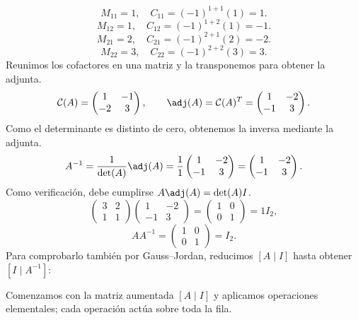 \[
M_{11}=1,\quad C_{11}=(-1)^{1+1}(1)=1.
\]
\[
M_{12}=1,\quad C_{12}=(-1)^{1+2}(1)=-1.
\]
\[
M_{21}=2,\quad C_{21}=(-1)^{2+1}(2)=-2.
\]
\[
M_{22}=3,\quad C_{22}=(-1)^{2+2}(3)=3.
\]
Reunimos los cofactores en una matriz y la transponemos para obtener la adjunta.
\[
\mathcal{C}(A)=\begin{pmatrix}1&-1\\-2&3\end{pmatrix},\qquad\adj(A)=\mathcal{C}(A)^T=\begin{pmatrix}1&-2\\-1&3\end{pmatrix}.
\]
Como el determinante es distinto de cero, obtenemos la inversa mediante la adjunta.
\[
A^{-1}=\frac1{\det(A)}\adj(A)=\frac1{1}\begin{pmatrix}1&-2\\-1&3\end{pmatrix}=\begin{pmatrix}1&-2\\-1&3\end{pmatrix}.
\]
Como verificación, debe cumplirse $A\adj(A)=\det(A)I$.
\[
\begin{pmatrix}3&2\\1&1\end{pmatrix}\begin{pmatrix}1&-2\\-1&3\end{pmatrix}=\begin{pmatrix}1&0\\0&1\end{pmatrix}=1I_{2},
\]
\[
AA^{-1}=\begin{pmatrix}1&0\\0&1\end{pmatrix}=I_{2}.
\]
Para comprobarlo también por Gauss--Jordan, reducimos $[A\mid I]$ hasta obtener $[I\mid A^{-1}]$:

Comenzamos con la matriz aumentada $[A\mid I]$ y aplicamos operaciones elementales; cada operación actúa sobre toda la fila.

